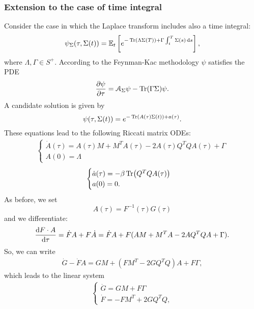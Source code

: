 \subsubsection{Extension to the case of time integral}
Consider the case in which the Laplace transform includes also a time integral:
\begin{equation}
    \psi_{\Sigma}(\tau, \Sigma(t)) = \mathbb{E}_t\left[e^{-\Tr(\Lambda\Sigma(T))+\Gamma\int_t^T \Sigma(s)\,\dd s}\right],
\end{equation}
where $\Lambda, \Gamma \in S^+$. According to the Feynman-Kac methodology $\psi$ satisfies the PDE
\begin{equation}
    \pdv{\psi}{\tau} = \mathcal{A}_{\Sigma}\psi - \Tr(\Gamma\Sigma)\psi.
\end{equation}
A candidate solution is given by
\begin{equation}
    \psi(\tau,\Sigma(t)) = e^{-\Tr(A(\tau)\Sigma(t)) + a(\tau)}.
\end{equation}
These equations lead to the following Riccati matrix ODEs:
\begin{align*}
    \begin{cases}
        \dot{A}(\tau) = A(\tau)M + M^TA(\tau) - 2A(\tau)Q^TQA(\tau) + \Gamma \\
        A(0) = \Lambda
    \end{cases}
\end{align*}
\begin{align*}
    \begin{cases}
        \dot{a}(\tau) = -\beta\Tr(Q^TQA(\tau)) \\
        a(0) = 0.
    \end{cases}
\end{align*}
As before, we set
\begin{equation*}
    A(\tau) = F^{-1}(\tau)G(\tau)
\end{equation*}
and we differentiate:
\begin{align*}
    \dv{F\cdot A}{\tau} = \dot{F}A + F\dot{A} = \dot{F}A + F(AM+M^TA - 2AQ^TQA + \Gamma).
\end{align*}
So, we can write
\begin{align*}
    \dot{G} - \dot{F}A = GM + (FM^T - 2GQ^TQ)A + F\Gamma,
\end{align*}
which leads to the linear system
\begin{align*}
    \begin{cases}
        \dot{G} = GM + F\Gamma \\
        \dot{F} = -FM^T + 2GQ^TQ,
    \end{cases}
\end{align*}
